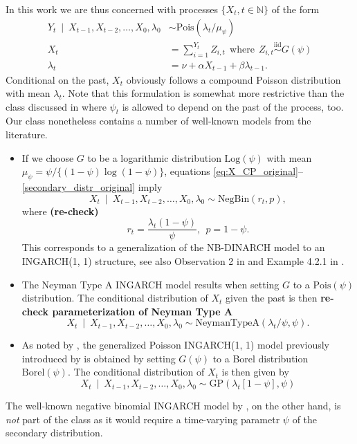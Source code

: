 \documentclass[10pt,a4paper]{article}
\begin{document}
In this work we are thus concerned with processes $\{X_t, t \in \mathbb{N}\}$ of the form
\begin{align}
Y_t \ \mid \ X_{t - 1}, X_{t - 2}, \dots, X_0, \lambda_0 & \sim \text{Pois}(\lambda_t/\mu_\psi) \label{eq:X_CP_original}\\
X_t & = \sum_{i = 1}^{Y_t} Z_{i, t} \ \ \text{where} \ \  Z_{i, t} \stackrel{\text{iid}}{\sim} G(\psi)\label{secondary_distr_original}\\
\lambda_t & = \nu + \alpha X_{t - 1} + \beta \lambda_{t - 1}.\label{eq:lambda_CP_original}
\end{align}
Conditional on the past, $X_t$ obviously follows a compound Poisson distribution with mean $\lambda_t$. Note that this formulation is somewhat more restrictive than the class discussed in \citep{Goncalves2015} where $\psi_t$ is allowed to depend on the past of the process, too. Our class nonetheless contains a number of well-known models from the literature. %

\begin{itemize}
\item If we choose $G$ to be a logarithmic distribution $\text{Log}(\psi)$ with mean $\mu_\psi = \psi/\{(1 - \psi)\log(1 - \psi)\}$, equations \eqref{eq:X_CP_original}--\eqref{secondary_distr_original} imply
$$
X_t  \ \mid \ X_{t - 1}, X_{t - 2}, \dots, X_0, \lambda_0 \sim \text{NegBin}(r_t, p),
$$
where \textbf{(re-check)}
$$
r_t = \frac{\lambda_t(1 - \psi)}{\psi}, \ \ p = 1 - \psi.
$$
This corresponds to a generalization of the NB-DINARCH model \cite{Xu2012} to an INGARCH(1, 1) structure, see also Observation 2 in \cite{Goncalves2015} and Example 4.2.1 in \cite{Weiss2018} .
\item The Neyman Type A INGARCH model \cite{Goncalves2015a} results when setting $G$ to a $\text{Pois}(\psi)$ distribution. The conditional distribution of $X_t$ given the past is then \textbf{re-check parameterization of Neyman Type A}
$$
X_t  \ \mid \ X_{t - 1}, X_{t - 2}, \dots, X_0, \lambda_0 \sim \text{NeymanTypeA}(\lambda_t/\psi, \psi).
$$
\item As noted by \cite{Goncalves2015}, the generalized Poisson INGARCH(1, 1) model previously introduced by \cite{Zhu2012a} is obtained by setting $G(\psi)$ to a Borel distribution $\text{Borel}(\psi)$. The conditional distribution of $X_t$ is then given by
$$
X_t  \ \mid \ X_{t - 1}, X_{t - 2}, \dots, X_0, \lambda_0 \sim \text{GP}(\lambda_t [1 - \psi], \psi)
$$
\end{itemize}
The well-known negative binomial INGARCH model by \cite{Zhu2012}, on the other hand, is \textit{not} part of the class as it would require a time-varying parametr $\psi$ of the secondary distribution.
\end{document}
